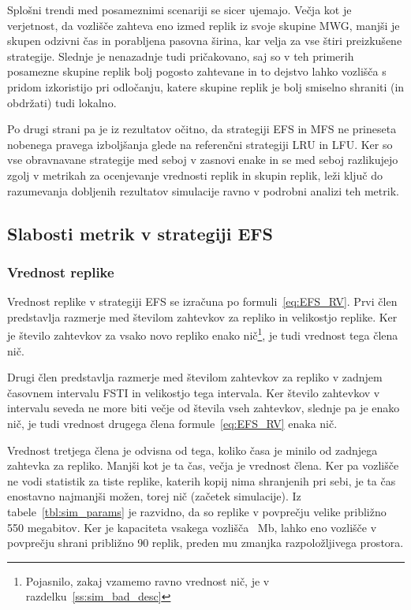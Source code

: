 \documentclass[a4paper, 12pt]{book}
\begin{document}
Splošni trendi med posameznimi scenariji se sicer ujemajo. Večja kot je
verjetnost, da vozlišče zahteva eno izmed replik iz svoje skupine MWG, manjši
je skupen odzivni čas in porabljena pasovna širina, kar velja za vse štiri
preizkušene strategije. Slednje je nenazadnje tudi pričakovano, saj so v teh
primerih posamezne skupine replik bolj pogosto zahtevane in to dejstvo lahko
vozlišča s pridom izkoristijo pri odločanju, katere skupine replik je bolj
smiselno shraniti (in obdržati) tudi lokalno.

Po drugi strani pa je iz rezultatov očitno, da strategiji EFS in MFS ne
prineseta nobenega pravega izboljšanja glede na referenčni strategiji LRU in
LFU. Ker so vse obravnavane strategije med seboj v zasnovi enake in se med
seboj razlikujejo zgolj v metrikah za ocenjevanje vrednosti replik in skupin
replik, leži ključ do razumevanja dobljenih rezultatov simulacije ravno v
podrobni analizi teh metrik.


\subsection{Slabosti metrik v strategiji EFS}
\label{ss:EFS_bad}

\subsubsection{Vrednost replike}

Vrednost replike v strategiji EFS se izračuna po formuli~\eqref{eq:EFS_RV}.
Prvi člen predstavlja razmerje med številom zahtevkov za repliko in velikostjo
replike. Ker je število zahtevkov za vsako novo repliko enako nič\footnote{%
Pojasnilo, zakaj vzamemo ravno vrednost nič, je v
razdelku~\ref{ss:sim_bad_desc}}, je tudi vrednost tega člena nič.

Drugi člen predstavlja razmerje med številom zahtevkov za repliko v zadnjem
časovnem intervalu FSTI in velikostjo tega intervala. Ker število zahtevkov
v intervalu seveda ne more biti večje od števila vseh zahtevkov,
slednje pa je enako nič, je tudi vrednost drugega člena
formule~\eqref{eq:EFS_RV} enaka nič.

Vrednost tretjega člena je odvisna od tega, koliko časa je minilo
od zadnjega zahtevka za repliko. Manjši kot je ta čas, večja je vrednost člena.
Ker pa vozlišče ne vodi statistik za tiste replike, katerih kopij nima
shranjenih pri sebi, je ta čas enostavno najmanjši možen, torej nič (začetek
simulacije). Iz tabele~\ref{tbl:sim_params} je razvidno, da so replike v
povprečju velike približno 550 megabitov. Ker je kapaciteta vsakega vozlišča
~Mb, lahko eno vozlišče v povprečju shrani približno 90
replik, preden mu zmanjka razpoložljivega prostora.
\end{document}
